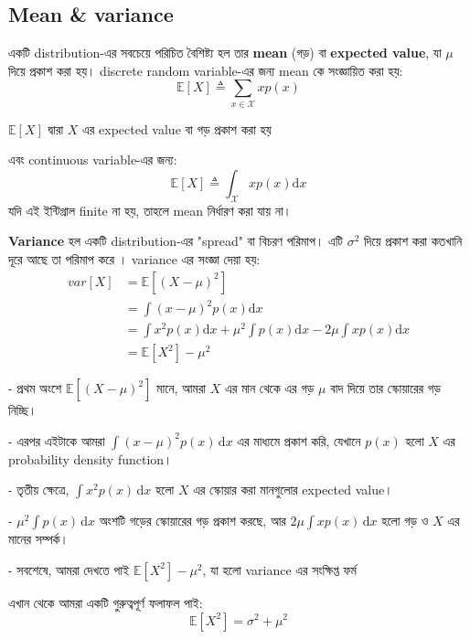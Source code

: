 \documentclass[graybox, envcountchap, twocolumn]{styles/svmult}
\begin{document}
\subsection{Mean & variance}
\bengalifont 
একটি distribution-এর সবচেয়ে পরিচিত বৈশিষ্ট্য হল তার \textbf{mean} (গড়) বা \textbf{expected value}, যা \(\mu\) দিয়ে প্রকাশ করা হয়। discrete random variable-এর জন্য mean কে সংজ্ঞায়িত করা হয়:
\[
\mathbb{E}[X] \triangleq \sum_{x \in \mathcal{X}}x p(x)
\]

 \textbf{\(\mathbb{E}[X]\)} {\bengalifont দ্বারা \(X\) এর expected value বা গড় প্রকাশ করা হয়}

এবং continuous variable-এর জন্য:
\[
\mathbb{E}[X] \triangleq \int_{\mathcal{X}}x p(x) \mathrm{d}x
\]
যদি এই ইন্টিগ্রাল finite না হয়, তাহলে mean নির্ধারণ করা যায় না।

\bengalifont 
\textbf{Variance} হল একটি distribution-এর "spread" বা বিচরণ পরিমাপ। এটি \(\sigma^2\) দিয়ে প্রকাশ করা কতখানি দূরে আছে তা পরিমাপ করে ।  variance এর সংজ্ঞা দেয়া হয়:
\begin{align}
var[X]& =\mathbb{E}[(X-\mu)^2] \\
      & =\int{(x-\mu)^2p(x)\mathrm{d}x} \nonumber \\
      & =\int{x^2p(x)\mathrm{d}x}+{\mu}^2\int{p(x)\mathrm{d}x}-2\mu\int{xp(x)\mathrm{d}x} \nonumber \\
	  & =\mathbb{E}[X^2]-{\mu}^2
\end{align}



-   {\bengalifont প্রথম অংশে \(\mathbb{E}[(X-\mu)^2]\) মানে, আমরা \(X\) এর মান থেকে এর গড় \( \mu \) বাদ দিয়ে তার স্কোয়ারের গড় নিচ্ছি।}


-   {\bengalifont এরপর এইটাকে আমরা \(\int (x-\mu)^2 p(x) \, \mathrm{d}x\) এর মাধ্যমে প্রকাশ করি, যেখানে \(p(x)\) হলো \(X\) এর probability density function।}



-   {\bengalifont তৃতীয় ক্ষেত্রে,  \(\int x^2 p(x) \, \mathrm{d}x\) হলো \(X\) এর স্কোয়ার করা মানগুলোর expected value।}


-   {\bengalifont \(\mu^2 \int p(x) \, \mathrm{d}x\) অংশটি গড়ের স্কোয়ারের গড় প্রকাশ করছে, আর \(2\mu \int x p(x) \, \mathrm{d}x\) হলো গড় ও \(X\) এর মানের সম্পর্ক।}


-   {\bengalifont সবশেষে, আমরা দেখতে পাই \(\mathbb{E}[X^2] - \mu^2\), যা হলো variance এর সংক্ষিপ্ত ফর্ম }

\bengalifont 
এখান থেকে আমরা একটি গুরুত্বপূর্ণ ফলাফল পাই:
\begin{equation}
\mathbb{E}[X^2]=\sigma^2+{\mu}^2
\end{equation}
\end{document}
